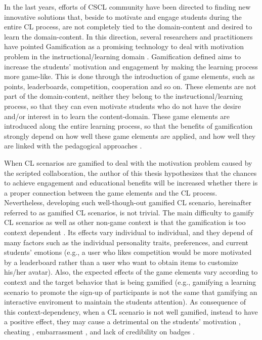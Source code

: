 In the last years, efforts of CSCL community have been directed to finding new innovative solutions that, beside to motivate and engage students during the entire CL process, are not completely tied to the domain-content and desired to learn the domain-content. In this direction, several researchers and practitioners have pointed Gamification as a promising technology to deal with motivation problem in the instructional/learning domain \cite{ChallcoMoreiraMizoguchiIsotani2014, SeabornFels2015, deSousaBorgesDurelliReisIsotani2014}.
Gamification defined  \cite{DeterdingDixonKhaledNacke2011} aims to increase the students' motivation and engagement by making the learning process more game-like. This is done through the introduction of game elements, such as points, leaderboards, competition, cooperation and so on. These elements are not part of the domain-content, neither they belong to the instructional/learning process, so that they can even motivate students who do not have the desire and/or interest in to learn the content-domain. These game elements are introduced along the entire learning process, so that the benefits of gamification strongly depend on how well these game elements are applied, and how well they are linked with the pedagogical approaches \cite{Kapp2012, KnutasIkonenNikulaPorras2014}.

When CL scenarios are gamified to deal with the motivation problem caused by the scripted collaboration, the author of this thesis hypothesizes that the chances to achieve engagement and educational benefits will be increased whether there is a proper connection between the game elements and the CL process. Nevertheless, developing such well-though-out gamified CL scenario, hereinafter referred to as gamified CL scenarios, is not trivial. The main difficulty to gamify CL scenarios as well as other non-game context is that the gamification is too context dependent \cite{HamariKoivistoSarsa2014, RichardsThompsonGraham2014}. Its effects vary individual to individual, and they depend of many factors such as the individual personality traits, preferences, and current students’ emotions \cite{Nicholson2015, PedroLopesPratesVassilevaIsotani2015} (e.g., a user who likes competition would be more motivated by a leaderboard rather than a user who want to obtain items to customize his/her avatar). Also, the expected effects of the game elements vary according to context and the target behavior that is being gamified \cite{DeterdingBjorkNackeDixonLawley2013, HeeterLeeMedlerMagerko2011} (e.g., gamifying a learning scenario to promote the sign-up of participants is not the same that gamifying an interactive enviroment to maintain the students attention). As consequence of this context-dependency, when a CL scenario is not well gamified, instead to have a positive effect, they may cause a detrimental on the students’ motivation \cite{AndradeMizoguchiIsotani2016}, cheating \cite{NunesBittencourtIsotaniJaques2016}, embarrassment \cite{OhnoYamasakiTokiwa2013}, and lack of credibility on badges \cite{DavisSingh2015}.

